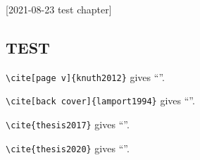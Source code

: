 [2021-08-23 test chapter]

\begin{refsection}
\chapter{TEST}

\verb+\cite[page v]{knuth2012}+ gives ``\cite[page v]{knuth2012}''.

\noindent
\verb+\cite[back cover]{lamport1994}+ gives ``\cite[back cover]{lamport1994}''.

\noindent
\verb+\cite{thesis2017}+ gives ``\cite{thesis2017}''.

\noindent
\verb+\cite{thesis2020}+ gives ``\cite{thesis2020}''.

\begin{singlespace}
\def\sllnsez{[1] }
\PrintChapterBibliography
\end{singlespace}
\end{refsection}
